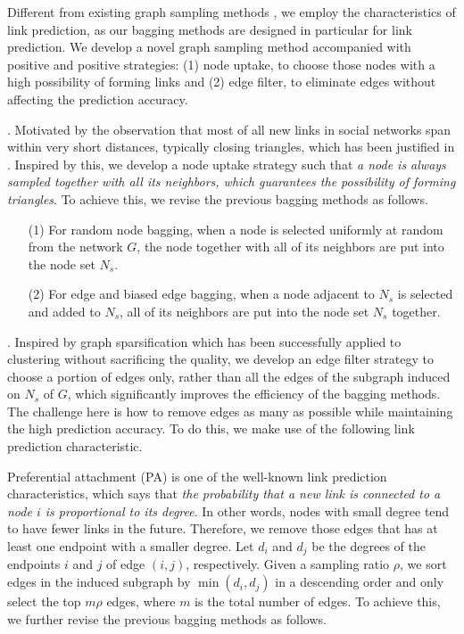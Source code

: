 Different from existing graph sampling methods \cite{ahmed2014tkdd, leskovec2006},
we employ the characteristics of link prediction, as our bagging methods are designed in particular for link prediction.
We develop a novel graph sampling method accompanied with positive and positive strategies:  
(1) node uptake, to choose those nodes with a high possibility of forming links  and (2) edge filter, to eliminate edges without affecting the prediction accuracy.


. Motivated by the observation that most of all new links in social networks span within very short distances, typically closing triangles, which has been justified in \cite{leskovec-2008}.  Inspired by this, we develop a node uptake strategy such that {\em a node is always sampled together
with all its neighbors, which guarantees the possibility of forming triangles}. To achieve this, we revise the previous bagging methods as follows.

\vspace{-1ex}
\begin{enumerate}
\item[(1)]
For random node bagging, when a node is selected uniformly at random from the network $G$, the node together with all of
its neighbors are put into the node set $N_s$.
\item[(2)]
For edge and biased edge bagging, when a node adjacent to $N_s$ is
 selected and added to $N_s$, all of its neighbors are put into the node set $N_s$ together.
\end{enumerate}
\vspace{-1ex}


. Inspired by graph sparsification \cite{chen2015, satuluri2011}
which has been successfully applied to clustering without sacrificing the quality,
we develop an edge filter strategy to choose a portion of edges only, rather than all the edges of the subgraph induced on $N_s$ of $G$,
which significantly improves the efficiency of the bagging methods.
The challenge here is how to remove edges as many as possible while maintaining the high prediction accuracy.
To do this, we make use of the following link prediction characteristic.


Preferential attachment (PA) \cite{albert1999,leskovec-2008} is one of the well-known
link prediction characteristics, which says that {\em the probability
that a new link is connected to a node $i$ is proportional to its degree}.
In other words, nodes with small degree tend to have fewer links in the future.
Therefore, we remove those edges that has at least one endpoint  with a smaller degree.
Let $d_i$ and $d_j$ be the degrees of the endpoints $i$  and $j$ of edge $(i, j)$, respectively. Given a sampling ratio $\rho$,
we sort edges in the induced subgraph by $\min(d_i, d_j)$ in a
descending order and only select the top $m\rho$ edges, where $m$ is the total number of edges.
%
To achieve this, we further revise the previous bagging methods as follows.

